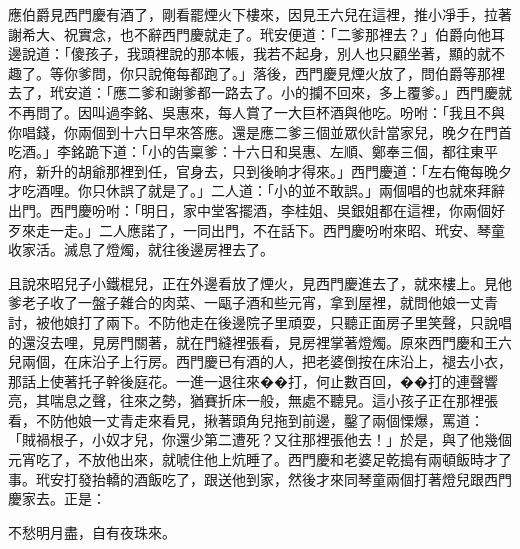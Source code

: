 應伯爵見西門慶有酒了，剛看罷煙火下樓來，因見王六兒在這裡，推小凈手，拉著謝希大、祝實念，也不辭西門慶就走了。玳安便道：「二爹那裡去？」伯爵向他耳邊說道：「傻孩子，我頭裡說的那本帳，我若不起身，別人也只顧坐著，顯的就不趣了。等你爹問，你只說俺每都跑了。」落後，西門慶見煙火放了，問伯爵等那裡去了，玳安道：「應二爹和謝爹都一路去了。小的攔不回來，多上覆爹。」西門慶就不再問了。因叫過李銘、吳惠來，每人賞了一大巨杯酒與他吃。吩咐：「我且不與你唱錢，你兩個到十六日早來答應。還是應二爹三個並眾伙計當家兒，晚夕在門首吃酒。」李銘跪下道：「小的告稟爹：十六日和吳惠、左順、鄭奉三個，都往東平府，新升的胡爺那裡到任，官身去，只到後晌才得來。」西門慶道：「左右俺每晚夕才吃酒哩。你只休誤了就是了。」二人道：「小的並不敢誤。」兩個唱的也就來拜辭出門。西門慶吩咐：「明日，家中堂客擺酒，李桂姐、吳銀姐都在這裡，你兩個好歹來走一走。」二人應諾了，一同出門，不在話下。西門慶吩咐來昭、玳安、琴童收家活。滅息了燈燭，就往後邊房裡去了。

且說來昭兒子小鐵棍兒，正在外邊看放了煙火，見西門慶進去了，就來樓上。見他爹老子收了一盤子雜合的肉菜、一甌子酒和些元宵，拿到屋裡，就問他娘一丈青討，被他娘打了兩下。不防他走在後邊院子里頑耍，只聽正面房子里笑聲，只說唱的還沒去哩，見房門關著，就在門縫裡張看，見房裡掌著燈燭。原來西門慶和王六兒兩個，在床沿子上行房。西門慶已有酒的人，把老婆倒按在床沿上，褪去小衣，那話上使著托子幹後庭花。一進一退往來��打，何止數百回，��打的連聲響亮，其喘息之聲，往來之勢，猶賽折床一般，無處不聽見。這小孩子正在那裡張看，不防他娘一丈青走來看見，揪著頭角兒拖到前邊，鑿了兩個慄爆，罵道： 「賊禍根子，小奴才兒，你還少第二遭死？又往那裡張他去！」於是，與了他幾個元宵吃了，不放他出來，就唬住他上炕睡了。西門慶和老婆足乾搗有兩頓飯時才了事。玳安打發抬轎的酒飯吃了，跟送他到家，然後才來同琴童兩個打著燈兒跟西門慶家去。正是：

不愁明月盡，自有夜珠來。


